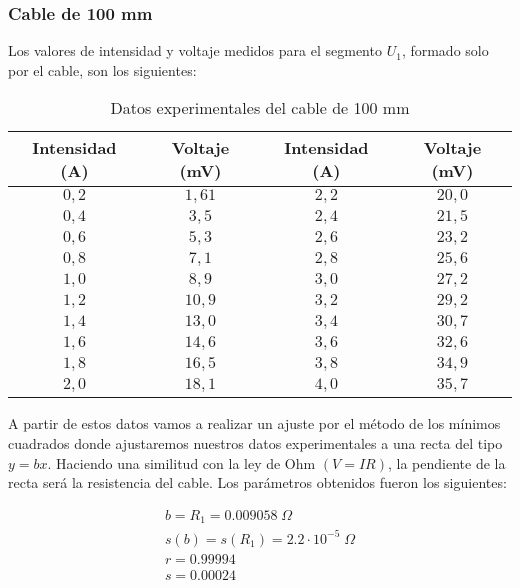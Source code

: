 \documentclass[a4paper,12pt,titlepage]{article}
\begin{document}
\subsubsection{Cable de 100 mm}

Los valores de intensidad y voltaje medidos para el segmento $U_{1}$, formado solo por el cable, son los siguientes:

\begin{table}[h!]
\centering
    \begin{tabular}{|c|c|c|c|}
        \hline
        Intensidad (A) & Voltaje (mV) & Intensidad (A) & Voltaje (mV) \\ \hline
        $0,2$ & $1,61$ & $2,2$ & $20,0$ \\ \hline
        $0,4$ & $3,5$ & $2,4$ & $21,5$ \\ \hline
        $0,6$ & $5,3$ & $2,6$ & $23,2$ \\ \hline
        $0,8$ & $7,1$ & $2,8$ & $25,6$ \\ \hline
        $1,0$ & $8,9$ & $3,0$ & $27,2$ \\ \hline
        $1,2$ & $10,9$ & $3,2$ & $29,2$ \\ \hline
        $1,4$ & $13,0$ & $3,4$ & $30,7$ \\ \hline
        $1,6$ & $14,6$ & $3,6$ & $32,6$ \\ \hline
        $1,8$ & $16,5$ & $3,8$ & $34,9$ \\ \hline
        $2,0$ & $18,1$ & $4,0$ & $35,7$ \\ \hline
    \end{tabular}
    \caption{Datos experimentales del cable de 100 mm}
\end{table}

A partir de estos datos vamos a realizar un ajuste por el método de los mínimos cuadrados donde ajustaremos nuestros datos experimentales a una recta del tipo $y=bx$. Haciendo una similitud con la ley de Ohm $(V=IR)$, la pendiente de la recta será la resistencia del cable. Los parámetros obtenidos fueron los siguientes:

\begin{equation}
    \begin{gathered}
        b =R_{1}= 0.009058 \; \Omega 
        \\
        s(b) = s(R_{1})= 2.2 \cdot 10^{-5} \; \Omega
        \\
        r = 0.99994
        \\
        s = 0.00024
    \end{gathered}
\end{equation}
\end{document}
